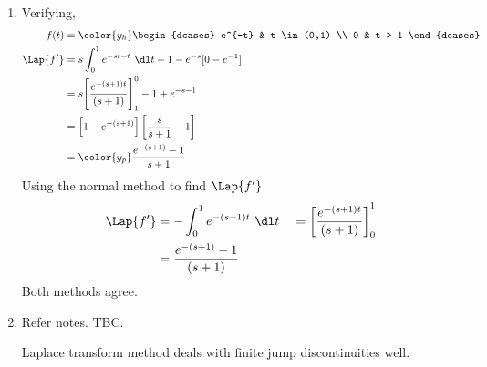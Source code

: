 \begin{enumerate}
\begin{enumerate}
              \item Verifying,
                    \begin{align}
                        f(t)       & = \color{y_h}\begin{dcases}
                                                      e^{-t} & t \in (0,1) \\
                                                      0      & t > 1
                                                  \end{dcases}             \\
                        \Lap\{f'\} & = s \int_{0}^{1}e^{-st - t}\ \dl t - 1
                        - e^{-s}[0 - e^{-1}]                                       \\
                                   & = s\Bigg[ \frac{e^{-(s+1)t}}{(s+1)}\Bigg]_1^0
                        - 1 + e^{-s-1}                                             \\
                                   & = \Big[1 - e^{-(s+1)}\Big]\left[
                        \frac{s}{s+1} - 1 \right]                                  \\
                                   & = \color{y_p} \frac{e^{-(s+1)} - 1}{s+1}
                    \end{align}
                    Using the normal method to find $ \Lap\{f'\} $
                    \begin{align}
                        \Lap\{f'\} & = -\int_{0}^{1} e^{-(s+1)t}\ \dl t             &
                                   & = \left[ \frac{e^{-(s+1)t}}{(s+1)} \right]_0^1   \\
                                   & = \frac{e^{-(s+1)} - 1}{(s+1)}
                    \end{align}
                    Both methods agree.
              \item Refer notes. TBC. \par
                    Laplace transform method deals with finite jump discontinuities well.
          \end{enumerate}
\end{enumerate}